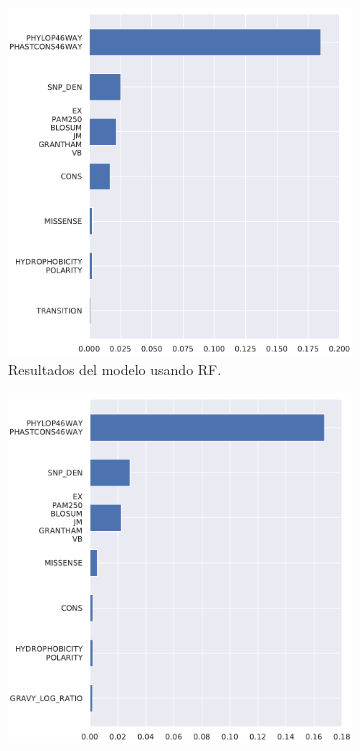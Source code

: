 \begin{figure}[H]
\begin{subfigure}[c]{0.45\linewidth}
\includegraphics[width=\linewidth]{documents/latex/figures/3/integral/integral_importance_cluster.pdf}
\caption{Resultados del modelo usando RF.}
\label{fig:importance_cluster_integral_rf}
\end{subfigure}
\begin{subfigure}[c]{0.45\linewidth}
\includegraphics[width=\linewidth]{documents/latex/figures/3/integral/integral_importance_cluster_xgb.pdf}

\end{subfigure}
\end{figure}
